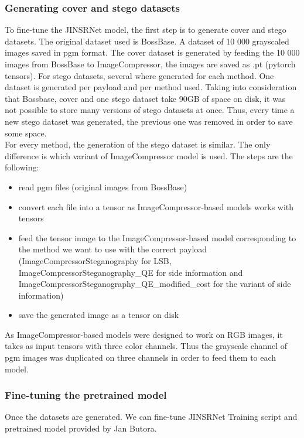 \documentclass[12pt]{article}
\begin{document}
\subsubsection{Generating cover and stego datasets}
To fine-tune the JINSRNet model, the first step is to generate cover and stego datasets. The original dataset used is BossBase. A dataset of 10 000 grayscaled images saved in pgm format. 
The cover dataset is generated by feeding the 10 000 images from BossBase to ImageCompressor, the images are saved as .pt (pytorch tensors). For stego datasets, several where generated for each method. One dataset is generated per payload and per method used. Taking into consideration that Bossbase, cover and one stego dataset take 90GB of space on disk, it was not possible to store many versions of stego datasets at once. Thus, every time a new stego dataset was generated, the previous one was removed in order to save some space.\\
For every method, the generation of the stego dataset is similar. The only difference is which variant of ImageCompressor model is used. The steps are the following:
\begin{itemize}
    \item read pgm files (original images from BossBase)
    \item convert each file into a tensor as ImageCompressor-based models works with tensors
    \item feed the tensor image to the ImageCompressor-based model corresponding to the method we want to use with the correct payload (ImageCompressorSteganography for LSB, ImageCompressorSteganography\_QE for side information and ImageCompressorSteganography\_QE\_modified\_cost for the variant of side information)
    \item save the generated image as a tensor on disk
\end{itemize}

As ImageCompressor-based models were designed to work on RGB images, it takes as input tensors with three color channels. Thus the grayscale channel of pgm images was duplicated on three channels in order to feed them to each model.

\subsubsection{Fine-tuning the pretrained model}
Once the datasets are generated. We can fine-tune JINSRNet
Training script and pretrained model provided by Jan Butora.
\end{document}
